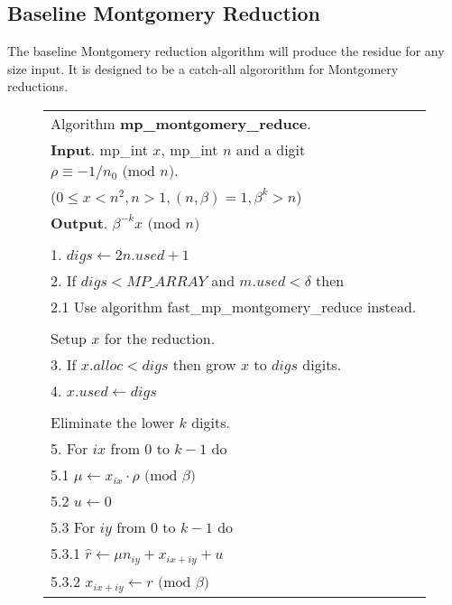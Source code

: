 \documentclass[b5paper]{book}
\begin{document}
\subsection{Baseline Montgomery Reduction}
The baseline Montgomery reduction algorithm will produce the residue for any size input.  It is designed to be a catch-all algororithm for 
Montgomery reductions.  

\newpage\begin{figure}[!here]
\begin{small}
\begin{center}
\begin{tabular}{l}
\hline Algorithm \textbf{mp\_montgomery\_reduce}. \\
\textbf{Input}.   mp\_int $x$, mp\_int $n$ and a digit $\rho \equiv -1/n_0 \mbox{ (mod }n\mbox{)}$. \\
\hspace{11.5mm}($0 \le x < n^2, n > 1, (n, \beta) = 1, \beta^k > n$) \\
\textbf{Output}.  $\beta^{-k}x \mbox{ (mod }n\mbox{)}$ \\
\hline \\
1.  $digs \leftarrow 2n.used + 1$ \\
2.  If $digs < MP\_ARRAY$ and $m.used < \delta$ then \\
\hspace{3mm}2.1  Use algorithm fast\_mp\_montgomery\_reduce instead. \\
\\
Setup $x$ for the reduction. \\
3.  If $x.alloc < digs$ then grow $x$ to $digs$ digits. \\
4.  $x.used \leftarrow digs$ \\
\\
Eliminate the lower $k$ digits. \\
5.  For $ix$ from $0$ to $k - 1$ do \\
\hspace{3mm}5.1  $\mu \leftarrow x_{ix} \cdot \rho \mbox{ (mod }\beta\mbox{)}$ \\
\hspace{3mm}5.2  $u \leftarrow 0$ \\
\hspace{3mm}5.3  For $iy$ from $0$ to $k - 1$ do \\
\hspace{6mm}5.3.1  $\hat r \leftarrow \mu n_{iy} + x_{ix + iy} + u$ \\
\hspace{6mm}5.3.2  $x_{ix + iy} \leftarrow \hat r \mbox{ (mod }\beta\mbox{)}$ \\

\end{tabular}
\end{center}
\end{small}
\end{figure}
\end{document}
